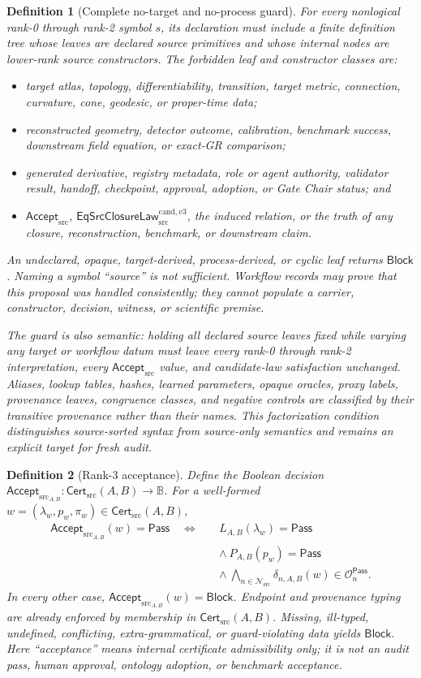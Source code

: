 \documentclass[11pt]{article}
\newtheorem{definition}{Definition}
\newcommand{\Cert}{\mathsf{Cert}_{\mathrm{src}}}
\newcommand{\Accept}{\mathsf{Accept}_{\mathrm{src}}}
\newcommand{\Law}{\mathsf{EqSrcClosureLaw}^{\mathrm{cand},v3}_{\mathrm{src}}}
\newcommand{\Block}{\mathsf{Block}}
\newcommand{\Pass}{\mathsf{Pass}}
\begin{document}
\begin{definition}[Complete no-target and no-process guard]
For every nonlogical rank-0 through rank-2 symbol \(s\), its declaration must
include a finite definition tree whose leaves are declared source primitives
and whose internal nodes are lower-rank source constructors. The forbidden
leaf and constructor classes are:
\begin{itemize}[leftmargin=*]
  \item target atlas, topology, differentiability, transition, target metric,
  connection, curvature, cone, geodesic, or proper-time data;
  \item reconstructed geometry, detector outcome, calibration, benchmark
  success, downstream field equation, or exact-GR comparison;
  \item generated derivative, registry metadata, role or agent authority,
  validator result, handoff, checkpoint, approval, adoption, or Gate Chair
  status; and
  \item \(\Accept\), \(\Law\), the induced relation, or the truth of any
  closure, reconstruction, benchmark, or downstream claim.
\end{itemize}
An undeclared, opaque, target-derived, process-derived, or cyclic leaf returns
\(\Block\). Naming a symbol ``source'' is not sufficient. Workflow records may
prove that this proposal was handled consistently; they cannot populate a
carrier, constructor, decision, witness, or scientific premise.

The guard is also semantic: holding all declared source leaves fixed while
varying any target or workflow datum must leave every rank-0 through rank-2
interpretation, every \(\Accept\) value, and candidate-law satisfaction
unchanged. Aliases, lookup tables, hashes, learned parameters, opaque oracles,
proxy labels, provenance leaves, congruence classes, and negative controls are
classified by their transitive provenance rather than their names. This
factorization condition distinguishes source-sorted syntax from source-only
semantics and remains an explicit target for fresh audit.
\end{definition}

\begin{definition}[Rank-3 acceptance]
Define the Boolean decision
\(\Accept_{A,B}:\Cert(A,B)\to\mathbb B\). For a well-formed
\(w=(\lambda_w,p_w,\pi_w)\in\Cert(A,B)\),
\[
\begin{split}
 \Accept_{A,B}(w)=\Pass\quad\Longleftrightarrow\quad&
 L_{A,B}(\lambda_w)=\Pass\\
 &\wedge\ P_{A,B}(p_w)=\Pass\\
 &\wedge\
 \bigwedge_{n\in\mathcal N_{\mathrm{src}}}
 \delta_{n,A,B}(w)\in\mathcal O_n^{\Pass}.
\end{split}
\]
In every other case, \(\Accept_{A,B}(w)=\Block\).
Endpoint and provenance typing are already enforced by membership in
\(\Cert(A,B)\). Missing, ill-typed, undefined, conflicting, extra-grammatical,
or guard-violating data yields \(\Block\).
Here ``acceptance'' means internal certificate admissibility only; it is not an
audit pass, human approval, ontology adoption, or benchmark acceptance.
\end{definition}
\end{document}

